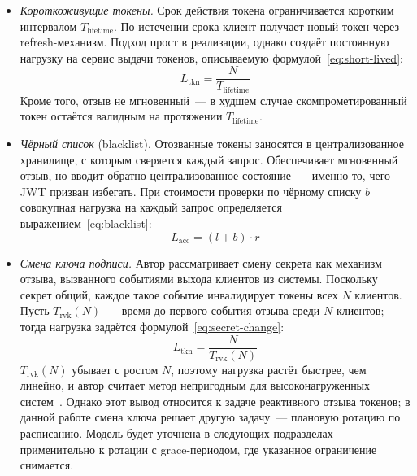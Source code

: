 \begin{itemize}
  \item \emph{Короткоживущие токены.}
    Срок действия токена ограничивается коротким интервалом $T_{\text{lifetime}}$.
    По истечении срока клиент получает новый токен через refresh-механизм.
    Подход прост в реализации, однако создаёт постоянную нагрузку
    на сервис выдачи токенов, описываемую формулой~\eqref{eq:short-lived}:
    \begin{equation}\label{eq:short-lived}
      L_{\text{tkn}} = \frac{N}{T_{\text{lifetime}}}
    \end{equation}
    Кроме того, отзыв не мгновенный~--- в худшем случае
    скомпрометированный токен остаётся валидным на протяжении $T_{\text{lifetime}}$.

  \item \emph{Чёрный список} (blacklist).
    Отозванные токены заносятся в централизованное хранилище,
    с которым сверяется каждый запрос.
    Обеспечивает мгновенный отзыв, но вводит обратно централизованное состояние~---
    именно то, чего JWT призван избегать.
    При стоимости проверки по чёрному списку $b$
    совокупная нагрузка на каждый запрос определяется
    выражением~\eqref{eq:blacklist}:
    \begin{equation}\label{eq:blacklist}
      L_{\text{acc}} = (l + b) \cdot r
    \end{equation}

  \item \emph{Смена ключа подписи.}
    Автор рассматривает смену секрета как механизм отзыва,
    вызванного событиями выхода клиентов из системы.
    Поскольку секрет общий, каждое такое событие
    инвалидирует токены всех $N$ клиентов.
    Пусть $T_{\text{rvk}}(N)$~--- время до первого события отзыва
    среди $N$ клиентов; тогда нагрузка задаётся формулой~\eqref{eq:secret-change}:
    \begin{equation}\label{eq:secret-change}
      L_{\text{tkn}} = \frac{N}{T_{\text{rvk}}(N)}
    \end{equation}
    $T_{\text{rvk}}(N)$ убывает с ростом $N$,
    поэтому нагрузка растёт быстрее, чем линейно,
    и автор считает метод непригодным
    для высоконагруженных систем~\cite{Janoky2018}.
    Однако этот вывод относится к задаче реактивного отзыва токенов;
    в данной работе смена ключа решает другую задачу~---
    плановую ротацию по расписанию.
    Модель будет уточнена в следующих подразделах
    применительно к ротации с grace-периодом,
    где указанное ограничение снимается.
\end{itemize}

